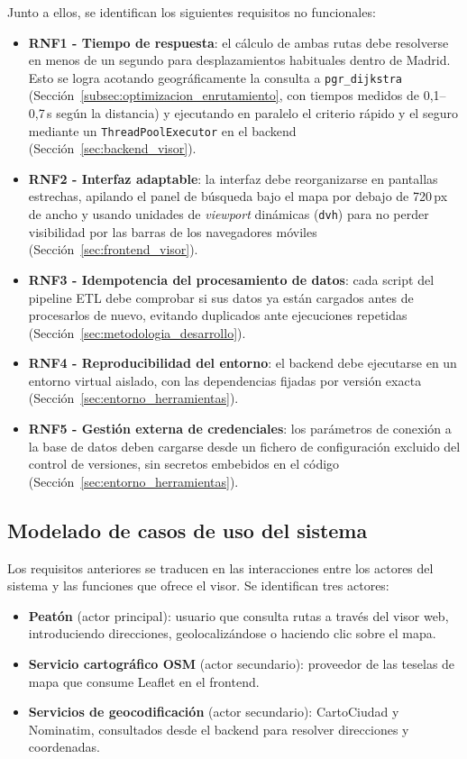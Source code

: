 Junto a ellos, se identifican los siguientes requisitos no funcionales:

\begin{itemize}
    \item \textbf{RNF1 - Tiempo de respuesta}: el cálculo de ambas rutas debe resolverse en menos de un segundo para desplazamientos habituales dentro de Madrid. Esto se logra acotando geográficamente la consulta a \texttt{pgr\_dijkstra} (Sección~\ref{subsec:optimizacion_enrutamiento}, con tiempos medidos de 0,1--0,7\,s según la distancia) y ejecutando en paralelo el criterio rápido y el seguro mediante un \texttt{ThreadPoolExecutor} en el backend (Sección~\ref{sec:backend_visor}).
    \item \textbf{RNF2 - Interfaz adaptable}: la interfaz debe reorganizarse en pantallas estrechas, apilando el panel de búsqueda bajo el mapa por debajo de 720\,px de ancho y usando unidades de \textit{viewport} dinámicas (\texttt{dvh}) para no perder visibilidad por las barras de los navegadores móviles (Sección~\ref{sec:frontend_visor}).
    \item \textbf{RNF3 - Idempotencia del procesamiento de datos}: cada script del pipeline ETL debe comprobar si sus datos ya están cargados antes de procesarlos de nuevo, evitando duplicados ante ejecuciones repetidas (Sección~\ref{sec:metodologia_desarrollo}).
    \item \textbf{RNF4 - Reproducibilidad del entorno}: el backend debe ejecutarse en un entorno virtual aislado, con las dependencias fijadas por versión exacta (Sección~\ref{sec:entorno_herramientas}).
    \item \textbf{RNF5 - Gestión externa de credenciales}: los parámetros de conexión a la base de datos deben cargarse desde un fichero de configuración excluido del control de versiones, sin secretos embebidos en el código (Sección~\ref{sec:entorno_herramientas}).
\end{itemize}

\subsection{Modelado de casos de uso del sistema}
\label{subsec:casos_uso}

Los requisitos anteriores se traducen en las interacciones entre los actores del sistema y las funciones que ofrece el visor. Se identifican tres actores:

\begin{itemize}
    \item \textbf{Peatón} (actor principal): usuario que consulta rutas a través del visor web, introduciendo direcciones, geolocalizándose o haciendo clic sobre el mapa.
    \item \textbf{Servicio cartográfico OSM} (actor secundario): proveedor de las teselas de mapa que consume Leaflet en el frontend.
    \item \textbf{Servicios de geocodificación} (actor secundario): CartoCiudad y Nominatim, consultados desde el backend para resolver direcciones y coordenadas.
\end{itemize}

